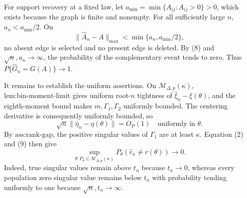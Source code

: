 For support recovery at a fixed law, let \(a_{\min}=\min\{A_{ij}:A_{ij}>0\}>0\), which exists because the graph is finite and nonempty.  For all sufficiently large \(n\), \(a_n<a_{\min}/2\).  On
\[
 \lVert\widehat A_n-A\rVert_{\max}<\min\{a_n,a_{\min}/2\},
\]
no absent edge is selected and no present edge is deleted.  By (8) and \(\sqrt n,a_n\to\infty\), the probability of the complementary event tends to zero.  Thus \(P\{\widehat G_n=G(A)\}\to1\).

It remains to establish the uniform assertions.  On \(\mathcal M_{\Delta,p}(\kappa)\), \(\text{lem:bin-moment-limit}\) gives uniform root-\(n\) tightness of \(\widehat\xi_n-\xi(\theta)\), and the eighth-moment bound makes \(m,\Gamma_1,\Gamma_2\) uniformly bounded.  The centering derivative is consequently uniformly bounded, so
\[
 \sqrt n\lVert\widehat\eta_n-\eta(\theta)\rVert=O_P(1)
\quad\text{uniformly in }\theta.
\tag{9}
\]
By \(\text{ass:rank-gap}\), the positive singular values of \(\Gamma_1\) are at least \(\kappa\).  Equation (2) and (9) then give
\[
 \sup_{\theta:P_\theta\in\mathcal M_{\Delta,p}(\kappa)}
 P_\theta(\widehat r_n\neq r(\theta))\longrightarrow0.
\tag{10}
\]
Indeed, true singular values remain above \(t_n\) because \(t_n\to0\), whereas every population zero singular value remains below \(t_n\) with probability tending uniformly to one because \(\sqrt n,t_n\to\infty\).

